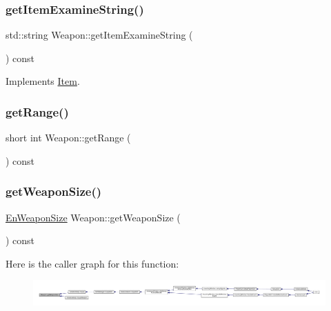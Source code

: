 \mbox{\label{class_weapon_aa52cecf0a3c34aba70a6425c36d40afa}} 
\subsubsection{\texorpdfstring{get\+Item\+Examine\+String()}{getItemExamineString()}}
{\footnotesize\ttfamily std\+::string Weapon\+::get\+Item\+Examine\+String (\begin{DoxyParamCaption}{ }\end{DoxyParamCaption}) const\hspace{0.3cm}{\ttfamily [virtual]}}



Implements \mbox{\hyperlink{class_item_a00e06647e1adeb62f2d95044476126ac}{Item}}.

\mbox{\label{class_weapon_a726f5f0de9244b9e24e52407272cdf08}} 
\subsubsection{\texorpdfstring{get\+Range()}{getRange()}}
{\footnotesize\ttfamily short int Weapon\+::get\+Range (\begin{DoxyParamCaption}{ }\end{DoxyParamCaption}) const}

\mbox{\label{class_weapon_a459fd4ef8f2eefc9be73f05b6ec42bcd}} 
\subsubsection{\texorpdfstring{get\+Weapon\+Size()}{getWeaponSize()}}
{\footnotesize\ttfamily \mbox{\hyperlink{_weapon_8hpp_a160076f6c574c69cd1ce2b3f42cf3755}{En\+Weapon\+Size}} Weapon\+::get\+Weapon\+Size (\begin{DoxyParamCaption}{ }\end{DoxyParamCaption}) const}

Here is the caller graph for this function\+:
\nopagebreak
\begin{figure}[H]
\begin{center}
\leavevmode
\includegraphics[width=350pt]{db/de5/class_weapon_a459fd4ef8f2eefc9be73f05b6ec42bcd_icgraph}
\end{center}
\end{figure}
\mbox{\label{class_weapon_a99c74249e561d0130575a2278a982a6c}} 
